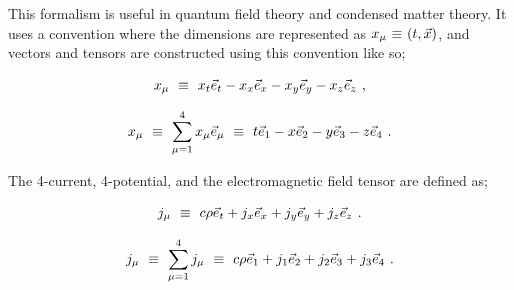 \documentclass{article}
\newcounter{subsubsubsection}[subsubsection]
\begin{document}
This formalism is useful in quantum field theory and condensed matter theory. It uses a convention where the dimensions are represented as \begin{math} x_{\mu} \hspace{0.025cm} \equiv \hspace{0.025cm} ( t, \vec{x} ) \end{math}, and vectors and tensors are constructed using this convention like so;

\begin{equation} \label{eb-eq-1002-12}
x_{\mu} \hspace{0.125cm} \equiv \hspace{0.125cm} x_t \vec{e}_t - x_x \vec{e}_x - x_y \vec{e}_y - x_z \vec{e}_z \hspace{0.125cm} ,
\end{equation}

\begin{equation} \label{eb-eq-1002-13}
x_{\mu} \hspace{0.125cm} \equiv \hspace{0.125cm} \sum_{\mu = 1}^{4} x_{\mu} \vec{e}_{\mu} \hspace{0.125cm} \equiv \hspace{0.125cm} t \vec{e}_1 - x \vec{e}_2 - y \vec{e}_3 - z \vec{e}_4 \hspace{0.125cm} .
\end{equation}

The 4-current, 4-potential, and the electromagnetic field tensor are defined as;

\begin{equation} \label{eb-eq-1002-14}
j_{\mu} \hspace{0.125cm} \equiv \hspace{0.125cm} c \rho \vec{e}_t + j_x \vec{e}_x + j_y \vec{e}_y + j_z \vec{e}_z \hspace{0.125cm} .
\end{equation}

\begin{equation} \label{eb-eq-1002-15}
j_{\mu} \hspace{0.125cm} \equiv \hspace{0.125cm} \sum_{\mu = 1}^{4} j_{\mu} \hspace{0.125cm} \equiv \hspace{0.125cm} c \rho \vec{e}_1 + j_1 \vec{e}_2 + j_2 \vec{e}_3 + j_3 \vec{e}_4 \hspace{0.125cm} .
\end{equation}
\end{document}
